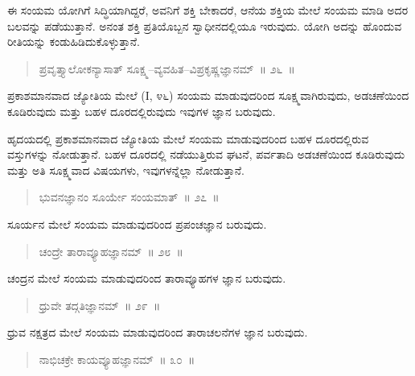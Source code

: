 ಈ ಸಂಯಮ ಯೋಗಿಗೆ ಸಿದ್ಧಿಯಾಗಿದ್ದರೆ, ಅವನಿಗೆ ಶಕ್ತಿ ಬೇಕಾದರೆ, ಆನೆಯ ಶಕ್ತಿಯ ಮೇಲೆ ಸಂಯಮ ಮಾಡಿ ಅದರ ಬಲವನ್ನು ಪಡೆಯುತ್ತಾನೆ. ಅನಂತ ಶಕ್ತಿ ಪ್ರತಿಯೊಬ್ಬನ ಸ್ವಾಧೀನದಲ್ಲಿಯೂ ಇರುವುದು. ಯೋಗಿ ಅದನ್ನು ಹೊಂದುವ ರೀತಿಯನ್ನು ಕಂಡುಹಿಡಿದುಕೊಳ್ಳುತ್ತಾನೆ. 

\vspace{-0.3cm}

\begin{verse}
ಪ್ರವೃತ್ತ್ಯಾಲೋಕನ್ಯಾಸಾತ್​ ಸೂಕ್ಷ್ಮ–ವ್ಯವಹಿತ–ವಿಪ್ರಕೃಷ್ಣಜ್ಞಾನಮ್​~॥ ೨೬~॥
\end{verse}

\vspace{-0.3cm}

ಪ್ರಕಾಶಮಾನವಾದ ಜ್ಯೋತಿಯ ಮೇಲೆ (I, ೪೬) ಸಂಯಮ ಮಾಡುವುದರಿಂದ ಸೂಕ್ಷ್ಮವಾಗಿರುವುದು, ಅಡಚಣೆಯಿಂದ ಕೂಡಿರುವುದು ಮತ್ತು ಬಹಳ ದೂರದಲ್ಲಿರುವುದು ಇವುಗಳ ಜ್ಞಾನ ಬರುವುದು. 

ಹೃದಯದಲ್ಲಿ ಪ್ರಕಾಶಮಾನವಾದ ಜ್ಯೋತಿಯ ಮೇಲೆ ಸಂಯಮ ಮಾಡುವುದರಿಂದ ಬಹಳ ದೂರದಲ್ಲಿರುವ ವಸ್ತುಗಳನ್ನು ನೋಡುತ್ತಾನೆ. ಬಹಳ ದೂರದಲ್ಲಿ ನಡೆಯುತ್ತಿರುವ ಘಟನೆ, ಪರ್ವತಾದಿ ಅಡಚಣೆಯಿಂದ ಕೂಡಿರುವುದು ಮತ್ತು ಅತಿ ಸೂಕ್ಷ್ಮವಾದ ವಿಷಯಗಳು, ಇವುಗಳನ್ನೆಲ್ಲಾ ನೋಡುತ್ತಾನೆ. 

\vspace{-0.3cm}

\begin{verse}
ಭುವನಜ್ಞಾನಂ ಸೂರ್ಯೇ ಸಂಯಮಾತ್​~॥ ೨೭~॥
\end{verse}

\vspace{-0.3cm}

ಸೂರ್ಯನ ಮೇಲೆ ಸಂಯಮ ಮಾಡುವುದರಿಂದ ಪ್ರಪಂಚಜ್ಞಾನ ಬರುವುದು. 

\vspace{-0.3cm}

\begin{verse}
ಚಂದ್ರೇ ತಾರಾವ್ಯೂಹಜ್ಞಾನಮ್​~॥ ೨೮~॥
\end{verse}

\vspace{-0.3cm}

ಚಂದ್ರನ ಮೇಲೆ ಸಂಯಮ ಮಾಡುವುದರಿಂದ ತಾರಾವ್ಯೂಹಗಳ ಜ್ಞಾನ ಬರುವುದು. 

\vspace{-0.3cm}

\begin{verse}
ಧ್ರುವೇ ತದ್ಗತಿಜ್ಞಾನಮ್​~॥ ೨೯~॥
\end{verse}

\vspace{-0.3cm}

ಧ್ರುವ ನಕ್ಷತ್ರದ ಮೇಲೆ ಸಂಯಮ ಮಾಡುವುದರಿಂದ ತಾರಾಚಲನೆಗಳ ಜ್ಞಾನ ಬರುವುದು. 

\vspace{-0.3cm}

\begin{verse}
ನಾಭಿಚಕ್ರೇ ಕಾಯವ್ಯೂಹಜ್ಞಾನಮ್​~॥ ೩೦~॥
\end{verse}

